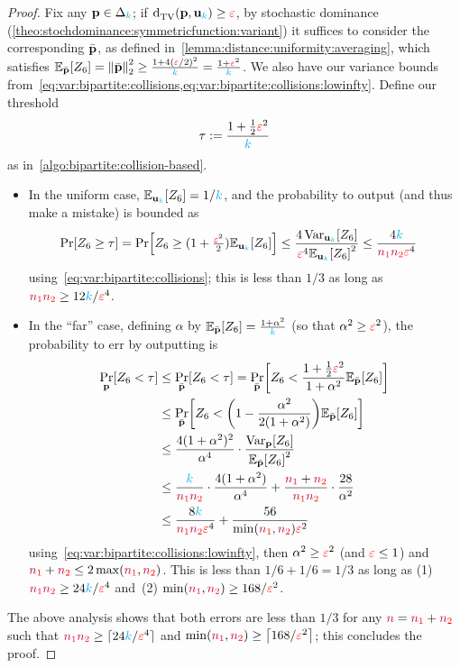 \begin{proof}
Fix any $\mathbf{p}\in\Delta_{{\textcolor{cyan}{k}}}$; if $\totalvardist{\p}{\uniform_\ab} \geq \dst$, by  stochastic dominance (\cref{theo:stochdominance:symmetricfunction:variant}) it suffices to consider the corresponding $\bar{\mathbf{p}}$, as defined in~\cref{lemma:distance:uniformity:averaging}, which satisfies $\bE{\bar{\p}}{Z_6} = \normtwo{\bar{\p}}^2 \geq \frac{1+4(\dst/2)^2}{\ab} = \frac{1+\dst^2}{\ab}$. We also have our variance bounds from~\cref{eq:var:bipartite:collisions,eq:var:bipartite:collisions:lowinfty}. Define our threshold
\[
    \tau := \frac{1+\frac{1}{2}\textcolor{red}{\varepsilon}^2}{{\textcolor{cyan}{k}}}
\]
as in~\cref{algo:bipartite:collision-based}.
\begin{itemize}
    \item In the uniform case, $\bE{\uniform_\ab}{Z_6} = 1/\ab$, and the probability to output \reject (and thus make a mistake) is bounded as
    \begin{align*}
    \bPr{Z_6 \geq \tau} 
    &= \bPr{Z_6 \geq (1+\tfrac{\dst^2}{2})\bE{\uniform_\ab}{Z_6}}  \leq \frac{4\Var_{\uniform_\ab}[Z_6]}{\dst^4\bE{\uniform_\ab}{Z_6}^2} 
    \leq \frac{4\ab}{\nss\nst\dst^4}
    \end{align*}
    using~\cref{eq:var:bipartite:collisions}; this is less than $1/3$ as long as $\textcolor{red}{{\textcolor{purple}{n}}_1}\textcolor{red}{{\textcolor{purple}{n}}_2} \geq 12{\textcolor{cyan}{k}}/\textcolor{red}{\varepsilon}^4$.
    \item In the ``far'' case, defining $\alpha$ by $\bE{\bar{\p}}{Z_6} = \frac{1+\alpha^2}{\ab}$ (so that $\alpha^2\geq \textcolor{red}{\varepsilon}^2$), the probability to err by outputting \accept is
    \begin{align*}
        \bP{\p}{Z_6 < \tau}  
        &\leq \bP{\bar{\p}}{Z_6 <  \tau} 
        = \bP{\bar{\p}}{Z_6 <  \frac{1+\frac{1}{2}\dst^2}{1+\alpha^2} \bE{\bar{\p}}{Z_6} } \\
        &\leq \bP{\bar{\p}}{Z_6 <  \Paren{1 - \frac{\alpha^2}{2(1+\alpha^2)}} \bE{\bar{\p}}{Z_6} } \\
        &\leq \frac{4(1+\alpha^2)^2}{\alpha^4}\cdot \frac{\Var_{\p}[Z_6]}{\bE{\bar{\p}}{Z_6}^2} \\
        &\leq \frac{\ab}{\nss\nst}\cdot \frac{4(1+\alpha^2)}{\alpha^4} + \frac{\nss+\nst}{\nss\nst}\cdot \frac{28}{\alpha^2}  \\
        &\leq \frac{8\ab}{\nss\nst\dst^4} + \frac{56}{\min(\nss,\nst)\dst^2}
    \end{align*}
    using~\cref{eq:var:bipartite:collisions:lowinfty}, then $\alpha^2\geq \textcolor{red}{\varepsilon}^2$ (and $\textcolor{red}{\varepsilon} \leq 1$) and $\textcolor{red}{{\textcolor{purple}{n}}_1}+\textcolor{red}{{\textcolor{purple}{n}}_2}\leq 2\max(\textcolor{red}{{\textcolor{purple}{n}}_1},\textcolor{red}{{\textcolor{purple}{n}}_2})$. This is less than $1/6+1/6=1/3$ as long as (1)~$\textcolor{red}{{\textcolor{purple}{n}}_1}\textcolor{red}{{\textcolor{purple}{n}}_2} \geq 24{\textcolor{cyan}{k}}/\textcolor{red}{\varepsilon}^4$ and~(2) $\min(\textcolor{red}{{\textcolor{purple}{n}}_1},\textcolor{red}{{\textcolor{purple}{n}}_2}) \geq 168/\textcolor{red}{\varepsilon}^2$.
\end{itemize}
  The above analysis shows that both errors are less than $1/3$ for any ${\textcolor{purple}{n}} = \textcolor{red}{{\textcolor{purple}{n}}_1}+\textcolor{red}{{\textcolor{purple}{n}}_2}$ such that $\textcolor{red}{{\textcolor{purple}{n}}_1}\textcolor{red}{{\textcolor{purple}{n}}_2} \geq \lceil{24{\textcolor{cyan}{k}}/\textcolor{red}{\ensuremath{\varepsilon}}^4}\rceil$ and $\min(\nss,\nst) \geq \clg{168/\dst^2}$; this concludes the proof.
\end{proof}

